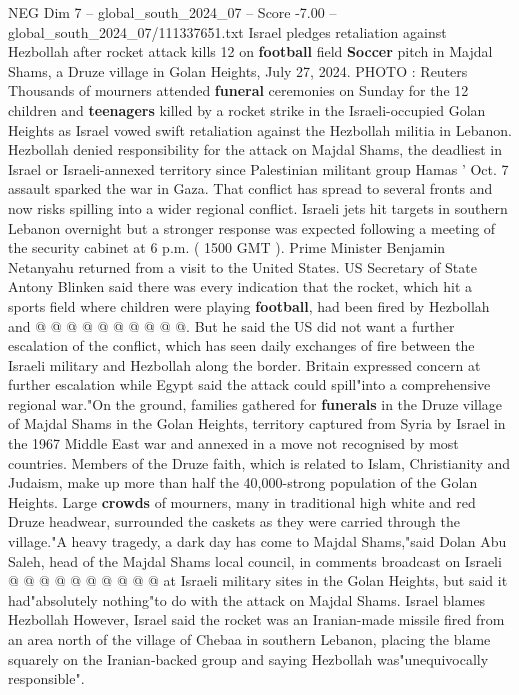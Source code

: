 \begin{textsample}{NEG Dim 7 – global\_south\_2024\_07 – Score -7.00 – global\_south\_2024\_07/111337651.txt}  \label{ex:f7_neg_331}
Israel pledges retaliation against Hezbollah after rocket attack kills 12 on \textbf{football} field \textbf{Soccer} pitch in Majdal Shams, a Druze village in Golan Heights, July 27, 2024.
PHOTO : Reuters Thousands of mourners attended \textbf{funeral} ceremonies on Sunday for the 12 children and \textbf{teenagers} killed by a rocket strike in the Israeli-occupied Golan Heights as Israel vowed swift retaliation against the Hezbollah militia in Lebanon.
Hezbollah denied responsibility for the attack on Majdal Shams, the deadliest in Israel or Israeli-annexed territory since Palestinian militant group Hamas ' Oct. 7 assault sparked the war in Gaza.
That conflict has spread to several fronts and now risks spilling into a wider regional conflict.
Israeli jets hit targets in southern Lebanon overnight but a stronger response was expected following a meeting of the security cabinet at 6 p.m. ( 1500 GMT ).
Prime Minister Benjamin Netanyahu returned from a visit to the United States.
US Secretary of State Antony Blinken said there was every indication that the rocket, which hit a sports field where children were playing \textbf{football}, had been fired by Hezbollah and @ @ @ @ @ @ @ @ @ @.
But he said the US did not want a further escalation of the conflict, which has seen daily exchanges of fire between the Israeli military and Hezbollah along the border.
Britain expressed concern at further escalation while Egypt said the attack could spill"into a comprehensive regional war."On the ground, families gathered for \textbf{funerals} in the Druze village of Majdal Shams in the Golan Heights, territory captured from Syria by Israel in the 1967 Middle East war and annexed in a move not recognised by most countries.
Members of the Druze faith, which is related to Islam, Christianity and Judaism, make up more than half the 40,000-strong population of the Golan Heights.
Large \textbf{crowds} of mourners, many in traditional high white and red Druze headwear, surrounded the caskets as they were carried through the village."A heavy tragedy, a dark day has come to Majdal Shams,"said Dolan Abu Saleh, head of the Majdal Shams local council, in comments broadcast on Israeli @ @ @ @ @ @ @ @ @ @ at Israeli military sites in the Golan Heights, but said it had"absolutely nothing"to do with the attack on Majdal Shams.
Israel blames Hezbollah However, Israel said the rocket was an Iranian-made missile fired from an area north of the village of Chebaa in southern Lebanon, placing the blame squarely on the Iranian-backed group and saying Hezbollah was"unequivocally responsible".

\end{textsample}
